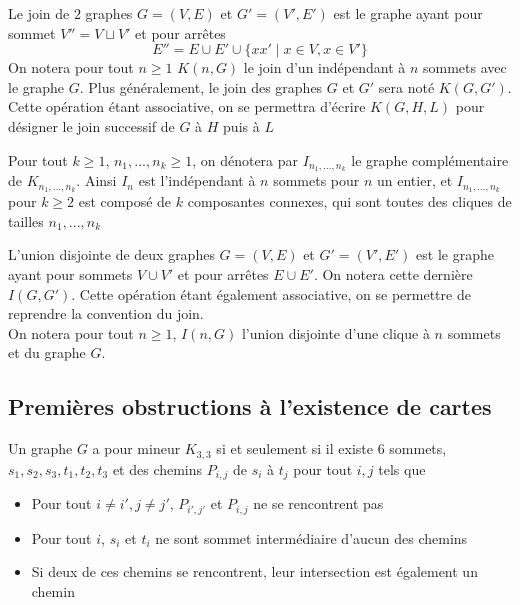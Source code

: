 \documentclass{scrartcl}
\begin{document}
\begin{flushleft}
\begin{def*}[Join]
    Le join de $2$ graphes $G = (V, E)$ et $G' = (V', E')$ est le graphe ayant pour sommet $V'' = V \sqcup V'$ et pour arrêtes
    \[ E'' = E \cup E' \cup \{ xx' \mid x \in V, x \in V' \} \]
    On notera pour tout $n \geq 1$ $K(n, G)$ le join d'un indépendant à $n$ sommets avec le graphe $G$. Plus généralement,
    le join des graphes $G$ et $G'$ sera noté $K(G, G')$. Cette opération étant associative, on se permettra
    d'écrire $K(G, H, L)$ pour désigner le join successif de $G$ à $H$ puis à $L$
\end{def*}

\begin{def*}
    Pour tout $k \geq 1$, $n_1, ..., n_k \geq 1$, on dénotera par $I_{n_1, ..., n_k}$ le graphe complémentaire de $K_{n_1, ..., n_k}$.
    Ainsi $I_n$ est l'indépendant à $n$ sommets pour $n$ un entier, et $I_{n_1, ..., n_k}$ pour $k \geq 2$ est composé de $k$
    composantes connexes, qui sont toutes des cliques de tailles $n_1, ..., n_k$
\end{def*}

\begin{def*}
    L'union disjointe de deux graphes $G = (V, E)$ et $G' = (V', E')$ est le graphe ayant pour sommets $V \cup V'$ et pour arrêtes
    $E \cup E'$. On notera cette dernière $I(G, G')$. Cette opération étant également associative, on se permettre de reprendre la
    convention du join.\\
    On notera pour tout $n \geq 1$, $I(n, G)$ l'union disjointe d'une clique à $n$ sommets et du graphe $G$.
\end{def*}

\subsection{Premières obstructions à l'existence de cartes}

\begin{lem}\label{CNSK33}
    Un graphe $G$ a pour mineur $K_{3,3}$ si et seulement si il existe $6$ sommets, $s_1, s_2, s_3, t_1, t_2, t_3$ et des chemins
    $P_{i,j}$ de $s_i$ à $t_j$ pour tout $i, j$ tels que
    \begin{itemize}
        \item Pour tout $i \neq i', j \neq j'$, $P_{i',j'}$ et $P_{i, j}$ ne se rencontrent pas
        \item Pour tout $i$, $s_i$ et $t_i$ ne sont sommet intermédiaire d'aucun des chemins
        \item Si deux de ces chemins se rencontrent, leur intersection est également un chemin
    \end{itemize}
\end{lem}


\end{flushleft}
\end{document}
